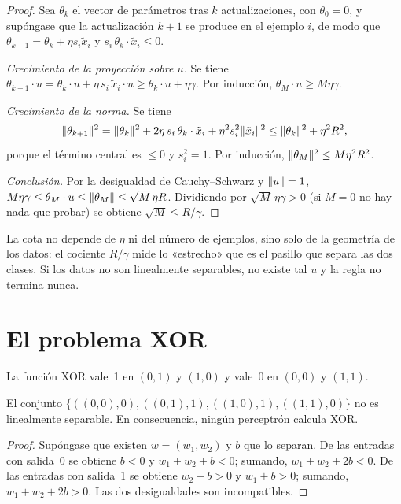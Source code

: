 \begin{proof}
Sea $\theta_k$ el vector de parámetros tras $k$ actualizaciones, con $\theta_0=0$, y supóngase que la actualización $k+1$ se produce en el ejemplo $i$, de modo que $\theta_{k+1}=\theta_k+\eta s_i\tilde x_i$ y $s_i\,\theta_k\cdot\tilde x_i\le 0$.

\emph{Crecimiento de la proyección sobre $u$.} Se tiene $\theta_{k+1}\cdot u=\theta_k\cdot u+\eta\,s_i\,\tilde x_i\cdot u\ge\theta_k\cdot u+\eta\gamma$. Por inducción, $\theta_M\cdot u\ge M\eta\gamma$.

\emph{Crecimiento de la norma.} Se tiene
\[
\lVert\theta_{k+1}\rVert^{2}=\lVert\theta_k\rVert^{2}+2\eta\,s_i\,\theta_k\cdot\tilde x_i+\eta^{2}s_i^{2}\lVert\tilde x_i\rVert^{2}\le\lVert\theta_k\rVert^{2}+\eta^{2}R^{2},
\]
porque el término central es $\le 0$ y $s_i^{2}=1$. Por inducción, $\lVert\theta_M\rVert^{2}\le M\eta^{2}R^{2}$.

\emph{Conclusión.} Por la desigualdad de Cauchy--Schwarz y $\lVert u\rVert=1$, $M\eta\gamma\le\theta_M\cdot u\le\lVert\theta_M\rVert\le\sqrt{M}\,\eta R$. Dividiendo por $\sqrt{M}\,\eta\gamma>0$ (si $M=0$ no hay nada que probar) se obtiene $\sqrt{M}\le R/\gamma$.
\end{proof}

\begin{observacion}
La cota no depende de $\eta$ ni del número de ejemplos, sino solo de la geometría de los datos: el cociente $R/\gamma$ mide lo «estrecho» que es el pasillo que separa las dos clases. Si los datos no son linealmente separables, no existe tal $u$ y la regla no termina nunca.
\end{observacion}

\section{El problema XOR}

La función XOR vale~1 en $(0,1)$ y $(1,0)$ y vale~0 en $(0,0)$ y $(1,1)$.

\begin{proposicion}\label{prop:xor}
El conjunto $\{((0,0),0),((0,1),1),((1,0),1),((1,1),0)\}$ no es linealmente separable. En consecuencia, ningún perceptrón calcula XOR.
\end{proposicion}

\begin{proof}
Supóngase que existen $w=(w_1,w_2)$ y $b$ que lo separan. De las entradas con salida~0 se obtiene $b<0$ y $w_1+w_2+b<0$; sumando, $w_1+w_2+2b<0$. De las entradas con salida~1 se obtiene $w_2+b>0$ y $w_1+b>0$; sumando, $w_1+w_2+2b>0$. Las dos desigualdades son incompatibles.
\end{proof}

